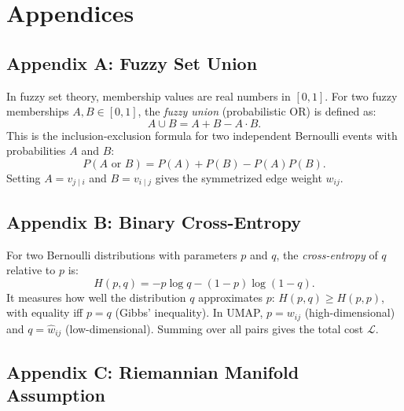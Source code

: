 \documentclass[11pt]{article}
\begin{document}
\begin{center}
\end{center}

\appendix
\section*{Appendices}

\subsection*{Appendix A: Fuzzy Set Union}\label{app:fuzzy}

In fuzzy set theory, membership values are real numbers in $[0,1]$. For two fuzzy memberships $A, B \in [0,1]$, the \emph{fuzzy union} (probabilistic OR) is defined as:
\[
  A \cup B = A + B - A \cdot B.
\]
This is the inclusion-exclusion formula for two independent Bernoulli events with probabilities $A$ and $B$:
\[
  P(A \text{ or } B) = P(A) + P(B) - P(A)P(B).
\]
Setting $A = v_{j\mid i}$ and $B = v_{i\mid j}$ gives the symmetrized edge weight $w_{ij}$.

\subsection*{Appendix B: Binary Cross-Entropy}\label{app:crossentropy}

For two Bernoulli distributions with parameters $p$ and $q$, the \emph{cross-entropy} of $q$ relative to $p$ is:
\[
  H(p, q) = -p \log q - (1-p)\log(1-q).
\]
It measures how well the distribution $q$ approximates $p$: $H(p,q) \geq H(p,p)$, with equality iff $p = q$ (Gibbs' inequality). In UMAP, $p = w_{ij}$ (high-dimensional) and $q = \hat{w}_{ij}$ (low-dimensional). Summing over all pairs gives the total cost $\mathcal{L}$.

\subsection*{Appendix C: Riemannian Manifold Assumption}\label{app:manifold}
\end{document}

